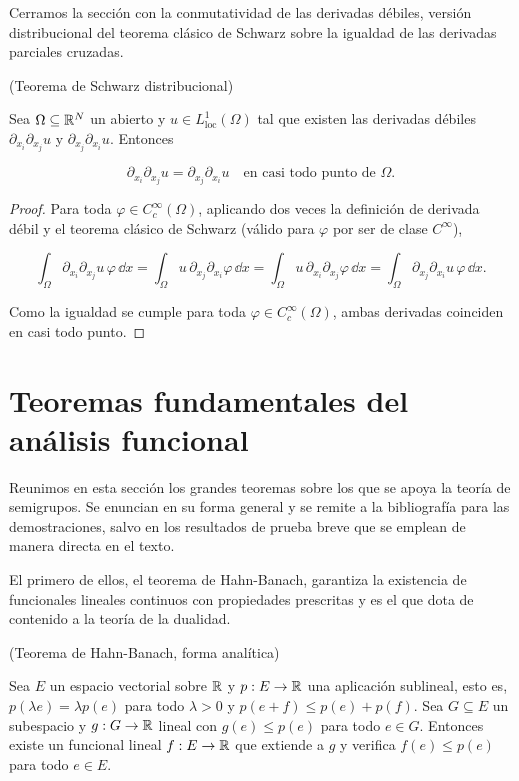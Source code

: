 Cerramos la sección con la conmutatividad de las derivadas débiles, versión
distribucional del teorema clásico de Schwarz sobre la igualdad de las derivadas
parciales cruzadas.\\

\begin{Teorema}{(Teorema de Schwarz distribucional)}
\label{ch:preliminares:th:schwarz}

Sea $\Omega \subseteq \mathbb{R}^N$ un abierto y $u \in L^1_{\mathrm{loc}}(\Omega)$ tal
que existen las derivadas débiles $\partial_{x_i}\partial_{x_j} u$ y
$\partial_{x_j}\partial_{x_i} u$. Entonces

\[\partial_{x_i}\partial_{x_j} u = \partial_{x_j}\partial_{x_i} u \quad \text{en casi todo punto de } \Omega.\]
\end{Teorema}

\begin{proof}
Para toda $\varphi \in C_c^\infty(\Omega)$, aplicando dos veces la definición de
derivada débil y el teorema clásico de Schwarz (válido para $\varphi$ por ser de
clase $C^\infty$),

\[\int_\Omega \partial_{x_i}\partial_{x_j} u \, \varphi \, \dd x = \int_\Omega u \, \partial_{x_j}\partial_{x_i}\varphi \, \dd x = \int_\Omega u \, \partial_{x_i}\partial_{x_j}\varphi \, \dd x = \int_\Omega \partial_{x_j}\partial_{x_i} u \, \varphi \, \dd x.\]

Como la igualdad se cumple para toda $\varphi \in C_c^\infty(\Omega)$, ambas
derivadas coinciden en casi todo punto.
\end{proof}

\section{Teoremas fundamentales del análisis funcional}
\label{ch:preliminares:section:teoremas}

Reunimos en esta sección los grandes teoremas sobre los que se apoya la teoría de
semigrupos. Se enuncian en su forma general y se remite a la bibliografía para
las demostraciones, salvo en los resultados de prueba breve que se emplean de
manera directa en el texto.

El primero de ellos, el teorema de Hahn-Banach, garantiza la existencia de
funcionales lineales continuos con propiedades prescritas y es el que dota de
contenido a la teoría de la dualidad.\\

\begin{Teorema}{(Teorema de Hahn-Banach, forma analítica)}
\label{ch:preliminares:th:hahnBanach}

Sea $E$ un espacio vectorial sobre $\mathbb{R}$ y $p : E \rightarrow \mathbb{R}$ una aplicación
sublineal, esto es, $p(\lambda e) = \lambda p(e)$ para todo $\lambda > 0$ y
$p(e + f) \leq p(e) + p(f)$. Sea $G \subseteq E$ un subespacio y
$g : G \rightarrow \mathbb{R}$ lineal con $g(e) \leq p(e)$ para todo $e \in G$. Entonces
existe un funcional lineal $f : E \rightarrow \mathbb{R}$ que extiende a $g$ y verifica
$f(e) \leq p(e)$ para todo $e \in E$.
\end{Teorema}

